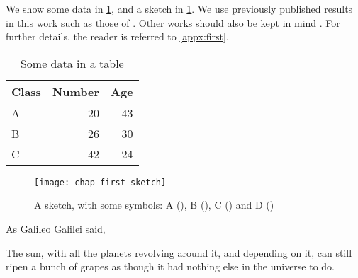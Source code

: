 We show some data in \cref{tab:chap-first-data}, and a sketch in \cref{fig:chap-first-sketch}.
We use previously published results in this work such as those of \textcite{villani2009}.
Other works should also be kept in mind \autocite{feynman-phd,nash1950}.
For further details, the reader is referred to \cref{appx:first}.
\begin{table}
  \caption{Some data in a table}
  \begin{tabular}{lrr}
    \toprule
    Class & Number & Age \\
    \midrule
    A     & 20     & 43 \\
    B     & 26     & 30 \\
    C     & 42     & 24 \\
    \bottomrule
  \end{tabular}
  \label{tab:chap-first-data}
\end{table}
\begin{figure}
  \texttt{[image: chap\_first\_sketch]}
  \caption[A sketch, with some symbols]{A sketch, with some symbols: A (\protect\blackline), B (\protect\blueline), C (\protect\blackcross) and D (\protect\blacktriangle)}
  \label{fig:chap-first-sketch}
\end{figure}

As Galileo Galilei said,

\begin{displayquote}
  The sun, with all the planets revolving around it, and depending on it, can still ripen a bunch of grapes as though it had nothing else in the universe to do.
\end{displayquote}
